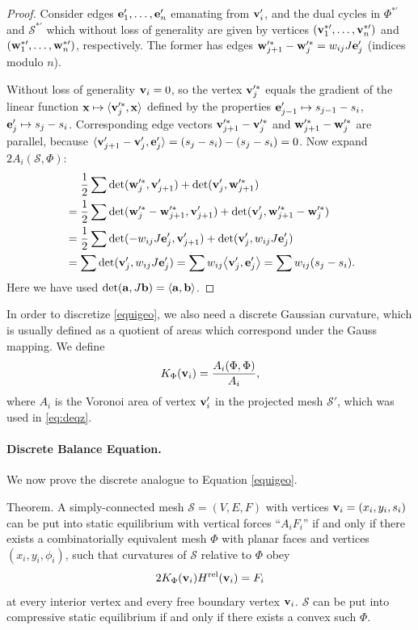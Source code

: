 \documentclass[annual]{acmsiggraph}
\def\<{\mathchoice{\big\langle}{\langle}{\langle}{\langle}}
\def\>{\mathchoice{\big\rangle}{\rangle}{\rangle}{\rangle}}
\def\rel{{\mathord{\text{\rm rel}}}}
\def\SS{{\mathcal S}}
\begin{document}
\begin{proof} Consider edges ${\mathbf e}'_1,\dots,{\mathbf e}'_n$ emanating from 
${\mathbf v}_i'$, and the dual cycles in $\Phi^{*\prime}$ and $\SS^{*\prime}$ 
which without loss of generality are given by vertices 
$({\mathbf v}^{*\prime}_1,\dots,{\mathbf v}^{*\prime}_n)$ and 
$({\mathbf w}^{*\prime}_1,\dots,{\mathbf w}^{*\prime}_n)$, respectively. The former has 
edges ${\mathbf w}'^*_{j+1}-{\mathbf w}'^*_j = w_{ij} J{\mathbf e}'_j$ (indices modulo $n$).

Without loss of generality ${\mathbf v}_i=0$, so the vertex ${\mathbf v}'^*_j$ equals the 
gradient of the linear function $\xw\mapsto \<\vw'^*_j,\xw\>$ defined by 
the properties ${\mathbf e}'_{j-1}\mapsto s_{j-1}-s_i$, ${\mathbf e}'_j\mapsto s_j-s_i$. 
Corresponding edge vectors ${\mathbf v}'^*_{j+1}-{\mathbf v}'^*_j$ and 
${\mathbf w}'^*_{j+1}-{\mathbf w}'^*_j$ are parallel, because 
$\<\vw'_{j+1}-\vw'_j,\ew'_j\>=(s_j-s_i)-(s_j-s_i)=0$. Now expand 
$2A_i(\SS,\Phi)$:
	\begin{align*}
	& \mathrel{\hphantom{=}}
		{1\over 2}\sum
		\det(\ww'^*_j, \vw'_{j+1}) + \det(\vw'_j, \ww'^*_{j+1})
	\\
	&=
		{1\over 2}\sum
		\det(\ww'^*_j-\ww'^*_{j+1}, \vw'_{j+1}) 
		+ \det(\vw'_j, \ww'^*_{j+1}-\ww'^*_j)
		\\
	&= 
		{1\over 2}\sum
		\det( - w_{ij} J\ew'_j, \vw'_{j+1}) 
	 	+ \det(\vw'_j,w_{ij} J\ew'_j)
	\\
	&= 	 \sum \det( \vw'_j, w_{ij} J\ew'_j) 
	=	 \sum	w_{ij} \< \vw'_j, \ew'_j\>
	= 	 \sum  w_{ij} (s_j-s_i).
	\end{align*}
 Here we have used $\det(\aw,J\bw)=\<\aw,\bw\>$.
 \end{proof}


In order to discretize \eqref{equigeo}, we also need a discrete Gaussian 
curvature, which is usually defined as a quotient of areas which 
correspond under the Gauss mapping. We define
	$$
	K_\Phi({\mathbf v}_i) = {A_i(\Phi,\Phi) \over A_i},
	$$
 where $A_i$ is the Voronoi area of vertex ${\mathbf v}_i'$ in the projected mesh 
$\SS'$, which was used in \eqref{eq:deqz}.

\paragraph{Discrete Balance Equation.}

We now prove the discrete analogue to Equation \eqref{equigeo}.

\proclaim Theorem.
 A simply-connected mesh $\SS=(V,E,F)$ with vertices ${\mathbf v}_i=(x_i,y_i,s_i)$ 
can be put into static equilibrium with vertical forces ``$A_iF_i$'' if 
and only if there exists a combinatorially equivalent mesh $\Phi$ with 
planar faces and vertices $(x_i,y_i,\phi_i)$, such that curvatures of 
$\SS$ relative to $\Phi$ obey
	\begin{equation}
	2 K_\Phi(\vw_i) H^\rel(\vw_i) = F_i
	\label{eq:deqiso}
	\end{equation}
 at every interior vertex and every free boundary vertex ${\mathbf v}_i$. $\SS$ 
can be put into compressive static equilibrium if and only if there exists 
a convex such $\Phi$.
\end{document}
